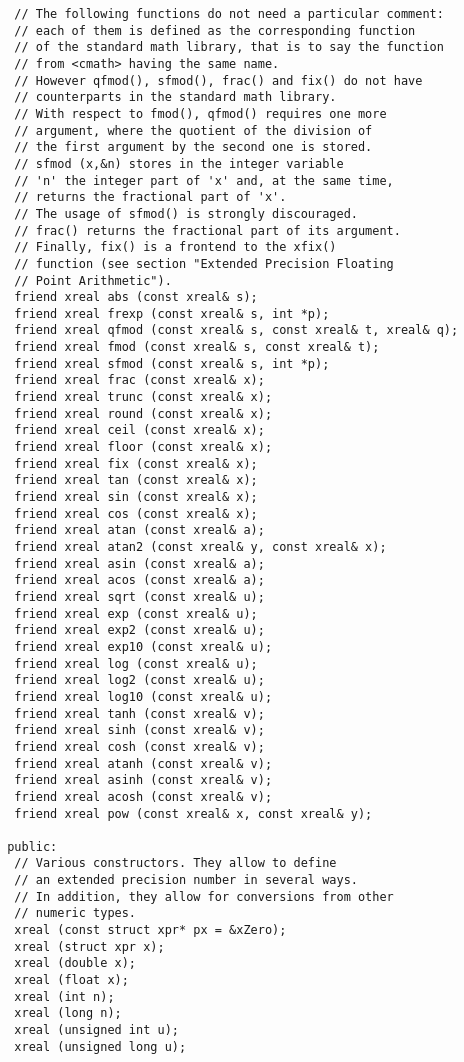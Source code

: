 \documentclass{article}
\begin{document}
\begin{verbatim}
  // The following functions do not need a particular comment:
  // each of them is defined as the corresponding function
  // of the standard math library, that is to say the function
  // from <cmath> having the same name.
  // However qfmod(), sfmod(), frac() and fix() do not have
  // counterparts in the standard math library. 
  // With respect to fmod(), qfmod() requires one more
  // argument, where the quotient of the division of
  // the first argument by the second one is stored.
  // sfmod (x,&n) stores in the integer variable
  // 'n' the integer part of 'x' and, at the same time,
  // returns the fractional part of 'x'. 
  // The usage of sfmod() is strongly discouraged.
  // frac() returns the fractional part of its argument.  
  // Finally, fix() is a frontend to the xfix() 
  // function (see section "Extended Precision Floating
  // Point Arithmetic").
  friend xreal abs (const xreal& s);
  friend xreal frexp (const xreal& s, int *p);
  friend xreal qfmod (const xreal& s, const xreal& t, xreal& q);
  friend xreal fmod (const xreal& s, const xreal& t);
  friend xreal sfmod (const xreal& s, int *p);
  friend xreal frac (const xreal& x);
  friend xreal trunc (const xreal& x);
  friend xreal round (const xreal& x);
  friend xreal ceil (const xreal& x);
  friend xreal floor (const xreal& x);
  friend xreal fix (const xreal& x);
  friend xreal tan (const xreal& x);
  friend xreal sin (const xreal& x);
  friend xreal cos (const xreal& x);
  friend xreal atan (const xreal& a);
  friend xreal atan2 (const xreal& y, const xreal& x);
  friend xreal asin (const xreal& a);
  friend xreal acos (const xreal& a);
  friend xreal sqrt (const xreal& u);
  friend xreal exp (const xreal& u);
  friend xreal exp2 (const xreal& u);
  friend xreal exp10 (const xreal& u);
  friend xreal log (const xreal& u);
  friend xreal log2 (const xreal& u);
  friend xreal log10 (const xreal& u);
  friend xreal tanh (const xreal& v);
  friend xreal sinh (const xreal& v);
  friend xreal cosh (const xreal& v);
  friend xreal atanh (const xreal& v);
  friend xreal asinh (const xreal& v);
  friend xreal acosh (const xreal& v);
  friend xreal pow (const xreal& x, const xreal& y);
  
 public:
  // Various constructors. They allow to define
  // an extended precision number in several ways.
  // In addition, they allow for conversions from other
  // numeric types.
  xreal (const struct xpr* px = &xZero);
  xreal (struct xpr x);
  xreal (double x);
  xreal (float x);
  xreal (int n);
  xreal (long n);
  xreal (unsigned int u);
  xreal (unsigned long u);


\end{verbatim}
\end{document}
